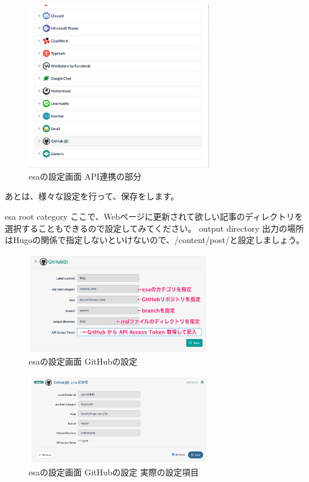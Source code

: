   \begin{figure}[H]
    \centering
    \includegraphics[width=8cm]{./image/02-chap7/esa-setting-list.png}
    \caption{esaの設定画面 API連携の部分 }
    \label{chap7-esa-setting-list-image}
  \end{figure}

  あとは、様々な設定を行って、保存をします。

  esa root category
  ここで、Webページに更新されて欲しい記事のディレクトリを選択することもできるので設定してみてください。
  output directory
  出力の場所はHugoの関係で指定しないといけないので、/content/post/と設定しましょう。

  \begin{figure}[H]
    \centering
    \includegraphics[width=8cm]{./image/02-chap7/github-setting.png}
    \caption{esaの設定画面 GitHubの設定 }
    \label{chap7-github-setting-image}
  \end{figure}

  \begin{figure}[H]
    \centering
    \includegraphics[width=8cm]{./image/02-chap7/github-setting-writed.png}
    \caption{esaの設定画面 GitHubの設定 実際の設定項目 }
    \label{chap7-github-setting-writed-image}
  \end{figure}

